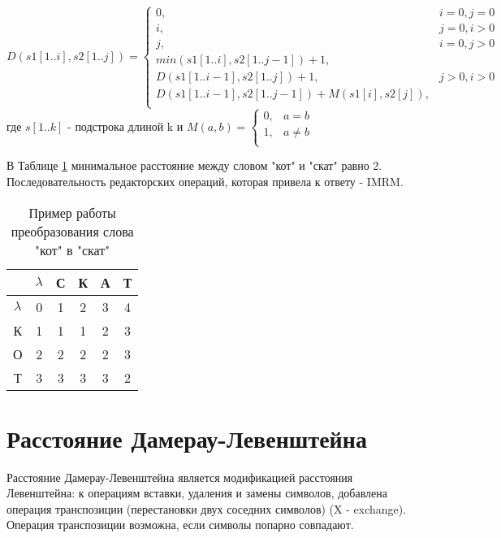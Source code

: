     \begin{equation}\label{formula:Levenshtein}
        D(s1[1..i],s2[1..j]) = \left\{ \begin{array}{ll}
            0, & \textrm{$i = 0, j = 0$}\\
            i, & \textrm{$j = 0, i > 0$}\\
            j, & \textrm{$i = 0, j > 0$}\\
           min(s1[1..i],s2[1..j-1]) + 1,\\
           D(s1[1..i-1],s2[1..j]) + 1, &\textrm{$j>0, i>0$}\\
           D(s1[1..i-1],s2[1..j-1]) + M(s1[i], s2[j]),\\
        \end{array} \right.
    \end{equation}
    где $s[1..k]$ - подстрока длиной k и 
    $M(a, b) = \left\{ \begin{array}{ll}
        0, & \textrm{$a = b$}\\
        1, & \textrm{$a \ne b$}\\
    \end{array} \right.$

    В Таблице \ref{table:example:Levenshtein} минимальное расстояние между
    словом "кот" и "скат" равно 2. Последовательность редакторских операций,
    которая привела к ответу - IMRM.

    \begin{table}[h]
        \caption{Пример работы преобразования слова "кот" в "скат"}
        \centering
        \begin{tabular}{|c|c|c|c|c|c|}
        \hline
  & $\lambda$ & С & К & А & Т \\ \hline
$\lambda$ & 0 & 1 & 2 & 3 & 4 \\ \hline
        К & 1 & 1 & 1 & 2 & 3 \\ \hline
        О & 2 & 2 & 2 & 2 & 3 \\ \hline
        Т & 3 & 3 & 3 & 3 & \cellcolor[HTML]{FFCCC9}2 \\ \hline
        \end{tabular}
        \label{table:example:Levenshtein}
    \end{table}

    \section{Расстояние Дамерау-Левенштейна}  
    Расстояние Дамерау-Левенштейна является модификацией расстояния Левенштейна:
    к операциям вставки, удаления и замены символов, добавлена операция транспозиции (перестановки
    двух соседних символов) (X - exchange). Операция транспозиции возможна, если символы попарно совпадают.

